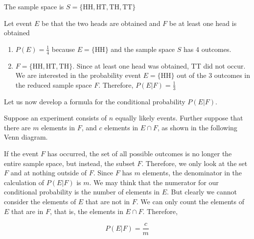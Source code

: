 \begin{solution}
    The sample space is \( S = \{\text{HH}, \text{HT}, \text{TH}, \text{TT}\} \)

    Let event \( E \) be that the two heads are obtained and \( F \) be at least one head is obtained
    \begin{enumerate}
        \item \( P(E) = \frac{1}{4} \) because \( E = \{\text{HH}\} \) and the sample space \( S \) has 4 outcomes.
        \item \( F = \{\text{HH}, \text{HT}, \text{TH}\} \). Since at least one head was obtained, TT did not occur. We are interested in the probability event \( E = \{\text{HH}\} \) out of the 3 outcomes in the reduced sample space \( F \). Therefore, \( P(E|F) = \frac{1}{3} \)
    \end{enumerate}
\end{solution}

Let us now develop a formula for the conditional probability \(P(E | F)\).

Suppose an experiment consists of \(n\) equally likely events. Further suppose that there are \(m\) elements in \(F\), and \(c\) elements in \(E \cap F\), as shown in the following Venn diagram.


\begin{center}
    \begin{venndiagram2sets}[
            labelA=\(E\),
            labelB=\(F\),
            labelAB={c},
            labelOnlyA={},
            labelOnlyB={m-c},
        ]
    \end{venndiagram2sets}
\end{center}

If the event \(F\) has occurred, the set of all possible outcomes is no longer the entire sample space, but instead, the subset \(F\). Therefore, we only look at the set \(F\) and at nothing outside of \(F\). Since \(F\) has \(m\) elements, the denominator in the calculation of \(P(E | F)\) is \(m\). We may think that the numerator for our conditional probability is the number of elements in \(E\). But clearly we cannot consider the elements of \(E\) that are not in \(F\). We can only count the elements of \(E\) that are in \(F\), that is, the elements in \(E \cap F\). Therefore,

\[
    P(E | F) = \frac{c}{m}
\]

